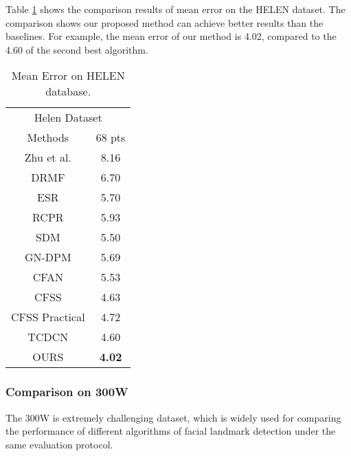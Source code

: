 \documentclass[journal]{IEEEtran}
\begin{document}
Table \ref{helen} shows the comparison results of mean error on the HELEN dataset. The comparison shows our proposed method can achieve better results than the baselines. For example, the mean error of our method is 4.02, compared to the 4.60 of the second best algorithm.

\begin{table}[h]
\small
    \centering \caption{Mean Error on HELEN database.}
    \begin{tabular}{c c }
        \hline
\multicolumn{2}{c}{Helen Dataset} \\
Methods & 68 pts \\
        \hline
  Zhu et al. & 8.16  \\

  DRMF & 6.70  \\

  ESR & 5.70   \\

  RCPR & 5.93  \\

  SDM & 5.50  \\

  GN-DPM & 5.69 \\

 CFAN & 5.53  \\

 CFSS& 4.63  \\

  CFSS Practical  & 4.72  \\
  TCDCN  & 4.60  \\
 \hline
  OURS & \textbf{4.02 }\\
 \hline
        \end{tabular}
    \label{helen}
\end{table}


\subsubsection{Comparison on 300W}
The 300W is extremely challenging dataset, which is widely used for comparing the performance of different algorithms of facial landmark detection under the same evaluation protocol.
\end{document}
